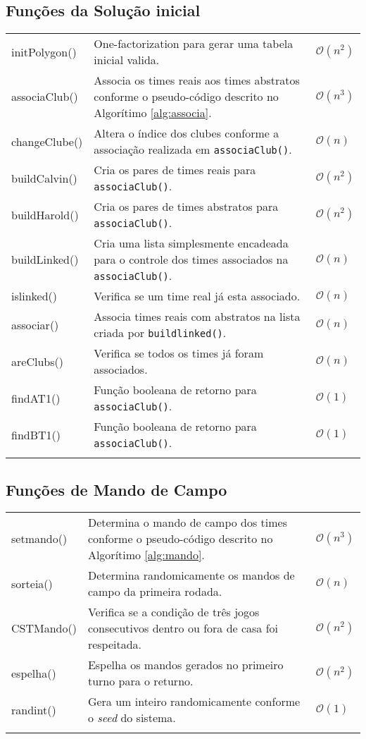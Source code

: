 \documentclass[12pt,a4paper]{article}
\numberwithin{figure}{section}
\numberwithin{table}{section}
\begin{document}
\subsection{Funções da Solução inicial}
	
\begin{longtable}{>{\ttfamily}p{3cm} p{11cm} p{1cm}}
	initPolygon() & One-factorization para gerar uma tabela inicial valida. & $\mathcal{O}(n^2)$ \\
	associaClub() & Associa os times reais aos times abstratos conforme o pseudo-código descrito no Algorítimo \ref{alg:associa}. & $\mathcal{O}(n^3)$ \\
	changeClube() & Altera o índice dos clubes conforme a associação realizada em \texttt{associaClub()}. & $\mathcal{O}(n)$ \\
	buildCalvin() & Cria os pares de times reais para \texttt{associaClub()}. & $\mathcal{O}(n^2)$ \\
	buildHarold() & Cria os pares de times abstratos para \texttt{associaClub()}. & $\mathcal{O}(n^2)$ \\
	buildLinked() & Cria uma lista simplesmente encadeada para o controle dos times associados na \texttt{associaClub()}. & $\mathcal{O}(n)$ \\
	islinked() & Verifica se um time real já esta associado. & $\mathcal{O}(n)$ \\
	associar() & Associa times reais com abstratos na lista criada por \texttt{buildlinked()}. & $\mathcal{O}(n)$ \\
	areClubs() & Verifica se todos os times já foram associados. & $\mathcal{O}(n)$ \\
	findAT1() & Função booleana de retorno para \texttt{associaClub()}. & $\mathcal{O}(1)$ \\
	findBT1() & Função booleana de retorno para \texttt{associaClub()}. & $\mathcal{O}(1)$ \\
	\label{tab:s0}
\end{longtable}
\vspace{-0.5cm}

\subsection{Funções de Mando de Campo}

\begin{longtable}{>{\ttfamily}p{3cm} p{11cm} p{1cm}}
	setmando() & Determina o mando de campo dos times conforme o pseudo-código descrito no Algorítimo \ref{alg:mando}. & $\mathcal{O}(n^3)$ \\
	sorteia() & Determina randomicamente os mandos de campo da primeira rodada. & $\mathcal{O}(n)$ \\
	CSTMando() & Verifica se a condição de três jogos consecutivos dentro ou fora de casa foi respeitada. & $\mathcal{O}(n^2)$ \\
	espelha() & Espelha os mandos gerados no primeiro turno para o returno. & $\mathcal{O}(n^2)$ \\
	randint() & Gera um inteiro randomicamente conforme o \textit{seed} do sistema. & $\mathcal{O}(1)$ \\
	\label{tab:mando}
\end{longtable}
\vspace{-0.5cm}
\end{document}
